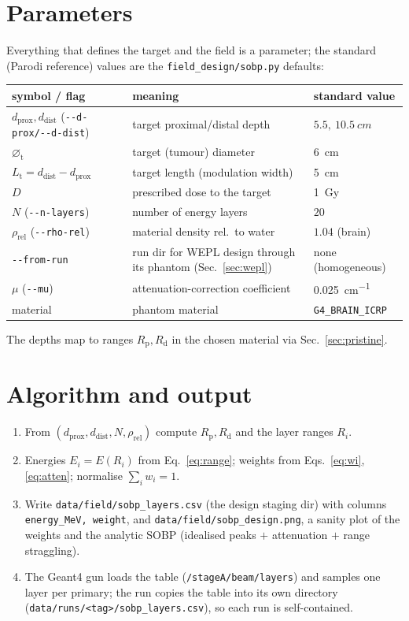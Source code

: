 \documentclass[11pt]{article}
\newcommand{\Rd}{R_{\mathrm d}}
\newcommand{\Rp}{R_{\mathrm p}}
\begin{document}
\section{Parameters}
\label{sec:params}

Everything that defines the target and the field is a parameter; the standard
(Parodi reference) values are the \texttt{field\_design/sobp.py} defaults:
\begin{center}
\begin{tabular}{lll}
\toprule
symbol / flag & meaning & standard value \\
\midrule
$d_{\mathrm{prox}},d_{\mathrm{dist}}$ (\texttt{-{}-d-prox/-{}-d-dist}) & target proximal/distal depth & $5.5,\ \SI{10.5}{cm}$ \\
$\varnothing_{\mathrm t}$ & target (tumour) diameter & \SI{6}{cm} \\
$L_{\mathrm t}=d_{\mathrm{dist}}-d_{\mathrm{prox}}$ & target length (modulation width) & \SI{5}{cm} \\
$D$ & prescribed dose to the target & \SI{1}{Gy} \\
$N$ (\texttt{-{}-n-layers}) & number of energy layers & $20$ \\
$\rho_{\mathrm{rel}}$ (\texttt{-{}-rho-rel}) & material density rel.\ to water & $1.04$ (brain) \\
\texttt{-{}-from-run} & run dir for WEPL design through its phantom (Sec.~\ref{sec:wepl}) & none (homogeneous) \\
$\mu$ (\texttt{-{}-mu}) & attenuation-correction coefficient & \SI{0.025}{cm^{-1}} \\
material & phantom material & \texttt{G4\_BRAIN\_ICRP} \\
\bottomrule
\end{tabular}
\end{center}
The depths map to ranges $\Rp,\Rd$ in the chosen material via Sec.~\ref{sec:pristine}.

\section{Algorithm and output}

\begin{enumerate}[nosep]
\item From $(d_{\mathrm{prox}},d_{\mathrm{dist}},N,\rho_{\mathrm{rel}})$ compute
$\Rp,\Rd$ and the layer ranges $R_i$.
\item Energies $E_i=E(R_i)$ from Eq.~\eqref{eq:range}; weights from
Eqs.~\eqref{eq:wi},\eqref{eq:atten}; normalise $\sum_i w_i=1$.
\item Write \texttt{data/field/sobp\_layers.csv} (the design staging dir) with
columns \texttt{energy\_MeV,\,weight}, and \texttt{data/field/sobp\_design.png}, a sanity plot
of the weights and the analytic SOBP (idealised peaks $+$ attenuation $+$ range
straggling).
\item The Geant4 gun loads the table (\texttt{/stageA/beam/layers}) and samples
one layer per primary; the run copies the table into its own directory
(\texttt{data/runs/<tag>/sobp\_layers.csv}), so each run is self-contained.
\end{enumerate}
\end{document}
